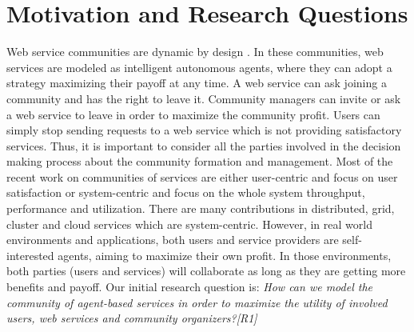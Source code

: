 \section{Motivation and Research Questions}\label{sec:researchquestions}

Web service communities are dynamic by design
\cite{DBLP:journals/ijebr/MaamarSTBB09}. In these communities, web
services are modeled as intelligent autonomous agents, where they
can adopt a strategy maximizing their payoff at any time. A web
service can ask joining a community and has the right to leave it.
Community managers can invite or ask a web service to leave in
order to maximize the community profit. Users can simply stop
sending requests to a web service which is not providing
satisfactory services. Thus, it is important to consider all the
parties involved in the decision making process about the
community formation and management. Most of the recent work on communities of
services are either user-centric and focus on user satisfaction
\cite{Chun02user-centricperformance} or system-centric and focus
on the whole system throughput, performance and utilization. There
are many contributions in distributed, grid, cluster and cloud
services which are system-centric. However, in real world
environments and applications, both users and service providers
are self-interested agents, aiming to maximize their own profit.
In those environments, both parties (users and services) will
collaborate as long as they are getting more benefits and payoff.
Our initial research question is: \emph{How can we model the
community of agent-based services in order to maximize the utility
of involved users, web services and community organizers?[R1]}


